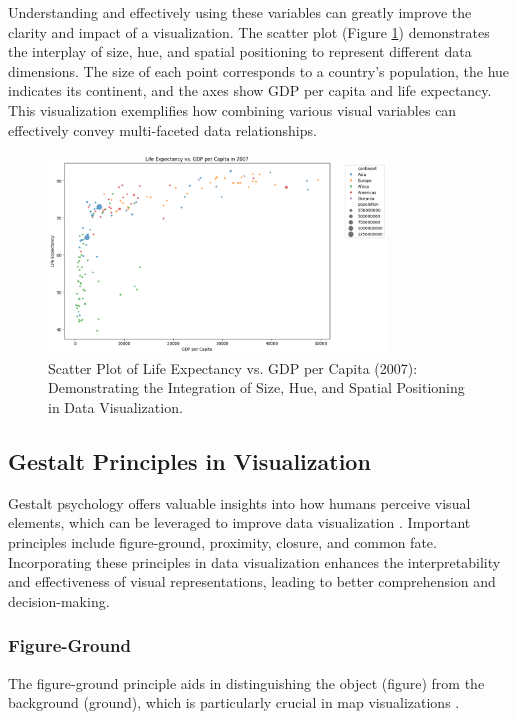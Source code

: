 Understanding and effectively using these variables can greatly improve the clarity and impact of a visualization. The scatter plot (Figure \ref{fig:lo2_scatter_plot}) demonstrates the interplay of size, hue, and spatial positioning to represent different data dimensions. The size of each point corresponds to a country's population, the hue indicates its continent, and the axes show GDP per capita and life expectancy. This visualization exemplifies how combining various visual variables can effectively convey multi-faceted data relationships.

\begin{figure}[h]
    \centering
    \includegraphics[width=0.8\textwidth]{images/plots/lo2_life_exp_vs_gdp_cap_2007.png} 
    \caption{Scatter Plot of Life Expectancy vs. GDP per Capita (2007): Demonstrating the Integration of Size, Hue, and Spatial Positioning in Data Visualization.}
    \label{fig:lo2_scatter_plot}
\end{figure}

\subsection{Gestalt Principles in Visualization}
Gestalt psychology offers valuable insights into how humans perceive visual elements, which can be leveraged to improve data visualization \cite{kohlerGestaltPsychology1929}. Important principles include figure-ground, proximity, closure, and common fate. Incorporating these principles in data visualization enhances the interpretability and effectiveness of visual representations, leading to better comprehension and decision-making.

\subsubsection{Figure-Ground}

The figure-ground principle aids in distinguishing the object (figure) from the background (ground), which is particularly crucial in map visualizations \cite{tverskySpatialSchemasMaps1999}.

